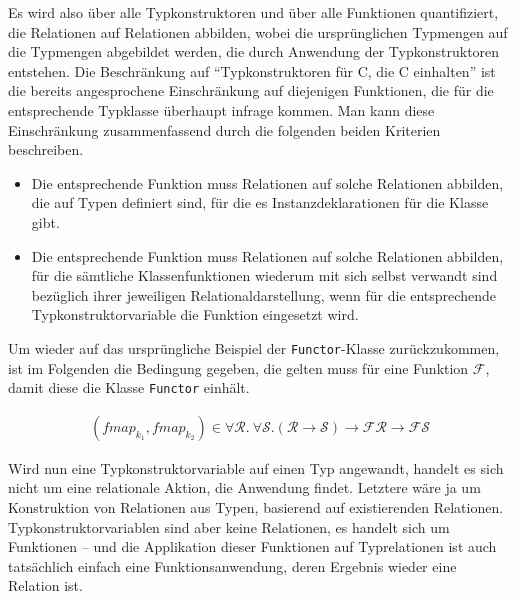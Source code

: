 Es wird also über alle Typkonstruktoren und über alle Funktionen quantifiziert, die Relationen auf Relationen abbilden, wobei die
ursprünglichen Typmengen auf die Typmengen abgebildet werden, die durch Anwendung der Typkonstruktoren entstehen.
Die Beschränkung auf ``Typkonstruktoren für C, die C einhalten'' ist die bereits angesprochene Einschränkung auf diejenigen Funktionen, die für die
entsprechende Typklasse überhaupt infrage kommen. Man kann diese Einschränkung zusammenfassend durch die folgenden
beiden Kriterien beschreiben.

\begin{itemize}
\item Die entsprechende Funktion muss Relationen auf solche Relationen abbilden, die auf Typen definiert sind, für die es Instanzdeklarationen
für die Klasse gibt.
\item Die entsprechende Funktion muss Relationen auf solche Relationen abbilden, für die sämtliche Klassenfunktionen wiederum mit sich selbst
verwandt sind bezüglich ihrer jeweiligen Relationaldarstellung, wenn für die entsprechende Typkonstruktorvariable die Funktion
eingesetzt wird.
\end{itemize}

Um wieder auf das ursprüngliche Beispiel der \texttt{Functor}-Klasse zurückzukommen, ist im Folgenden die Bedingung gegeben,
die gelten muss für eine Funktion $\mathcal{F}$, damit diese die Klasse \texttt{Functor} einhält.

\begin{align*}
(fmap_{k_1}, fmap_{k_2}) \in \forall \mathcal{R} . ~\forall \mathcal{S} . (\mathcal{R} \rightarrow \mathcal{S}) \rightarrow \mathcal{F} \mathcal{R}
\rightarrow \mathcal{F} \mathcal{S}
\end{align*}


Wird nun eine Typkonstruktorvariable auf einen Typ angewandt, handelt es sich nicht um eine relationale Aktion, die Anwendung findet.
Letztere wäre ja um Konstruktion von Relationen aus Typen, basierend auf existierenden Relationen.
Typkonstruktorvariablen sind aber keine Relationen, es handelt sich um Funktionen -- und die Applikation dieser Funktionen auf
Typrelationen ist auch tatsächlich einfach eine Funktionsanwendung, deren Ergebnis wieder eine Relation ist.

